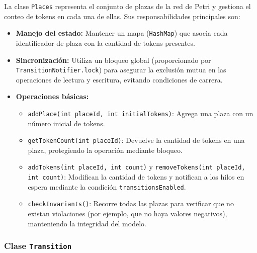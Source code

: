 \documentclass[12pt]{article}
\begin{document}
La clase \texttt{Places} representa el conjunto de plazas de la red de Petri y gestiona el conteo de tokens en cada una de ellas. Sus responsabilidades principales son:
\begin{itemize}
    \item \textbf{Manejo del estado:} Mantener un mapa (\texttt{HashMap}) que asocia cada identificador de plaza con la cantidad de tokens presentes.
    \item \textbf{Sincronización:} Utiliza un bloqueo global (proporcionado por \texttt{TransitionNotifier.lock}) para asegurar la exclusión mutua en las operaciones de lectura y escritura, evitando condiciones de carrera.
    \item \textbf{Operaciones básicas:} 
    \begin{itemize}
        \item \texttt{addPlace(int placeId, int initialTokens)}: Agrega una plaza con un número inicial de tokens.
        \item \texttt{getTokenCount(int placeId)}: Devuelve la cantidad de tokens en una plaza, protegiendo la operación mediante bloqueo.
        \item \texttt{addTokens(int placeId, int count)} y \texttt{removeTokens(int placeId, int count)}: Modifican la cantidad de tokens y notifican a los hilos en espera mediante la condición \texttt{transitionsEnabled}.
        \item \texttt{checkInvariants()}: Recorre todas las plazas para verificar que no existan violaciones (por ejemplo, que no haya valores negativos), manteniendo la integridad del modelo.
    \end{itemize}
\end{itemize}

\subsubsection{Clase \texttt{Transition}}
\end{document}

